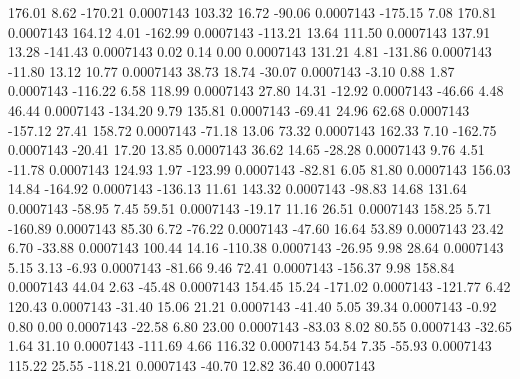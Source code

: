       176.01        8.62     -170.21     0.0007143
      103.32       16.72      -90.06     0.0007143
     -175.15        7.08      170.81     0.0007143
      164.12        4.01     -162.99     0.0007143
     -113.21       13.64      111.50     0.0007143
      137.91       13.28     -141.43     0.0007143
        0.02        0.14        0.00     0.0007143
      131.21        4.81     -131.86     0.0007143
      -11.80       13.12       10.77     0.0007143
       38.73       18.74      -30.07     0.0007143
       -3.10        0.88        1.87     0.0007143
     -116.22        6.58      118.99     0.0007143
       27.80       14.31      -12.92     0.0007143
      -46.66        4.48       46.44     0.0007143
     -134.20        9.79      135.81     0.0007143
      -69.41       24.96       62.68     0.0007143
     -157.12       27.41      158.72     0.0007143
      -71.18       13.06       73.32     0.0007143
      162.33        7.10     -162.75     0.0007143
      -20.41       17.20       13.85     0.0007143
       36.62       14.65      -28.28     0.0007143
        9.76        4.51      -11.78     0.0007143
      124.93        1.97     -123.99     0.0007143
      -82.81        6.05       81.80     0.0007143
      156.03       14.84     -164.92     0.0007143
     -136.13       11.61      143.32     0.0007143
      -98.83       14.68      131.64     0.0007143
      -58.95        7.45       59.51     0.0007143
      -19.17       11.16       26.51     0.0007143
      158.25        5.71     -160.89     0.0007143
       85.30        6.72      -76.22     0.0007143
      -47.60       16.64       53.89     0.0007143
       23.42        6.70      -33.88     0.0007143
      100.44       14.16     -110.38     0.0007143
      -26.95        9.98       28.64     0.0007143
        5.15        3.13       -6.93     0.0007143
      -81.66        9.46       72.41     0.0007143
     -156.37        9.98      158.84     0.0007143
       44.04        2.63      -45.48     0.0007143
      154.45       15.24     -171.02     0.0007143
     -121.77        6.42      120.43     0.0007143
      -31.40       15.06       21.21     0.0007143
      -41.40        5.05       39.34     0.0007143
       -0.92        0.80        0.00     0.0007143
      -22.58        6.80       23.00     0.0007143
      -83.03        8.02       80.55     0.0007143
      -32.65        1.64       31.10     0.0007143
     -111.69        4.66      116.32     0.0007143
       54.54        7.35      -55.93     0.0007143
      115.22       25.55     -118.21     0.0007143
      -40.70       12.82       36.40     0.0007143
